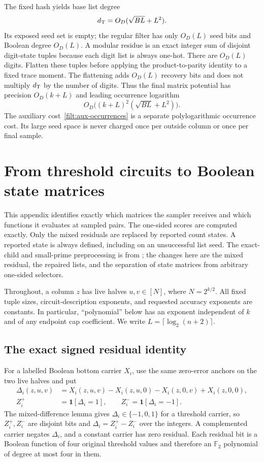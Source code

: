 \documentclass[11pt,letterpaper]{article}
\theoremstyle{definition}
\theoremstyle{remark}
\newcommand{\ind}{\mathbf 1}
\begin{document}
The fixed hash yields base list degree
\[
 d_{\rm T}=O_D(\sqrt{BL}+L^2).
\]
Its exposed seed set is empty; the regular filter has only $O_D(L)$
seed bits and Boolean degree $O_D(L)$.  A modular residue is an exact
integer sum of disjoint digit-state tuples because each digit list is
always one-hot.  There are $O_D(L)$ digits.  Flatten these tuples
before applying the product-to-parity identity to a fixed trace
moment.  The flattening adds $O_D(L)$ recovery bits and does not
multiply $d_{\rm T}$ by the number of digits.  Thus the final matrix
potential has precision $O_D(k+L)$ and leading occurrence logarithm
\begin{equation}\label{filt:final-load}
 O_D\bigl((k+L)^2(\sqrt{BL}+L^2)\bigr).
\end{equation}
The auxiliary cost~\eqref{filt:aux-occurrences} is a separate
polylogarithmic occurrence cost.  Its large seed space is never
charged once per outside column or once per final sample.


\section{From threshold circuits to Boolean state matrices}
\label{row:appendix}

This appendix identifies exactly which matrices the sampler receives and
which functions it evaluates at sampled pairs.  The one-sided scores are
computed exactly.  Only the mixed residuals are replaced by reported count
states.  A reported state is always defined, including on an unsuccessful
list seed.  The exact-child and small-prime preprocessing is from
\cite[Appendix~A.13]{NagCubic}; the changes here are the mixed residual,
the repaired lists, and the separation of state matrices from arbitrary
one-sided selectors.

Throughout, a column $z$ has live halves $u,v\in[N]$, where
$N=2^{k/2}$.  All fixed tuple sizes, circuit-description exponents, and
requested accuracy exponents are constants.  In particular, ``polynomial''
below has an exponent independent of $k$ and of any endpoint cap
coefficient.  We write $L=\lceil\log_2(n+2)\rceil$.

\subsection{The exact signed residual identity}

For a labelled Boolean bottom carrier $X_i$, use the same zero-error
anchors on the two live halves and put
\begin{align*}
 \Delta_i(z,u,v)
 &=X_i(z,u,v)-X_i(z,u,0)-X_i(z,0,v)+X_i(z,0,0),\\
 Z_i^+&=\ind[\Delta_i=1],\qquad Z_i^-=\ind[\Delta_i=-1].
\end{align*}
The mixed-difference lemma gives $\Delta_i\in\{-1,0,1\}$ for a
threshold carrier, so $Z_i^+,Z_i^-$ are disjoint bits and
$\Delta_i=Z_i^+-Z_i^-$ over the integers.  A complemented carrier
negates $\Delta_i$, and a constant carrier has zero residual.  Each
residual bit is a Boolean function of four original threshold values and
therefore an $\mathbb F_2$ polynomial of degree at most four in them.
\end{document}
